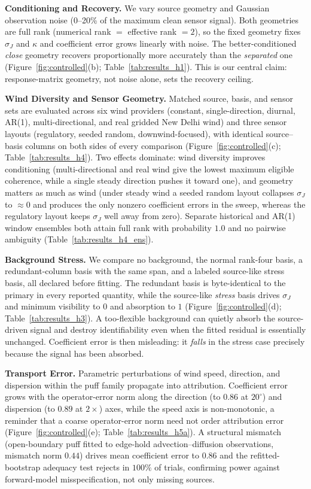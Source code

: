\noindent\textbf{Conditioning and Recovery.}
\label{subsec:results_h1}
We vary source geometry and Gaussian observation noise (0--20\% of the maximum
clean sensor signal).  Both geometries are full rank (numerical rank $=$ effective
rank $=2$), so the fixed geometry fixes $\sigma_J$ and $\kappa$ and coefficient
error grows linearly with noise.  The better-conditioned \emph{close} geometry
recovers proportionally more accurately than the \emph{separated} one
(Figure~\ref{fig:controlled}(b); Table~\ref{tab:results_h1}).  This is our central
claim: response-matrix geometry, not noise alone, sets the recovery ceiling.

\noindent\textbf{Wind Diversity and Sensor Geometry.}
\label{subsec:results_h4}
Matched source, basis, and sensor sets are evaluated across six wind providers
(constant, single-direction, diurnal, AR(1), multi-directional, and real gridded
New Delhi wind) and three sensor layouts (regulatory, seeded random,
downwind-focused), with identical source--basis columns on both sides of every
comparison (Figure~\ref{fig:controlled}(c); Table~\ref{tab:results_h4}).  Two
effects dominate: wind diversity improves conditioning (multi-directional and real
wind give the lowest maximum eligible coherence, while a single steady direction
pushes it toward one), and geometry matters as much as wind (under steady wind a
seeded random layout collapses $\sigma_J$ to $\approx0$ and produces the only
nonzero coefficient errors in the sweep, whereas the regulatory layout keeps
$\sigma_J$ well away from zero).  Separate historical and AR(1) window ensembles
both attain full rank with probability $1.0$ and no pairwise ambiguity
(Table~\ref{tab:results_h4_ens}).

\noindent\textbf{Background Stress.}
\label{subsec:results_h3}
We compare no background, the normal rank-four basis, a redundant-column basis with
the same span, and a labeled source-like stress basis, all declared before fitting.
The redundant basis is byte-identical to the primary in every reported quantity,
while the source-like \emph{stress} basis drives $\sigma_J$ and minimum visibility
to $0$ and absorption to $1$ (Figure~\ref{fig:controlled}(d);
Table~\ref{tab:results_h3}).  A too-flexible background can quietly absorb the
source-driven signal and destroy identifiability even when the fitted residual is
essentially unchanged.  Coefficient error is then misleading: it \emph{falls} in
the stress case precisely because the signal has been absorbed.

\noindent\textbf{Transport Error.}
Parametric perturbations of wind speed, direction, and dispersion within the puff
family propagate into attribution.  Coefficient error grows with the operator-error
norm along the direction (to $0.86$ at $20^\circ$) and dispersion (to $0.89$ at
$2\times$) axes, while the speed axis is non-monotonic, a reminder that a coarse
operator-error norm need not order attribution error (Figure~\ref{fig:controlled}(e);
Table~\ref{tab:results_h5a}).  A structural mismatch (open-boundary puff fitted to
edge-hold advection--diffusion observations, mismatch norm $0.44$) drives mean
coefficient error to $0.86$ and the refitted-bootstrap adequacy test rejects in
$100\%$ of trials, confirming power against forward-model misspecification, not only
missing sources.

